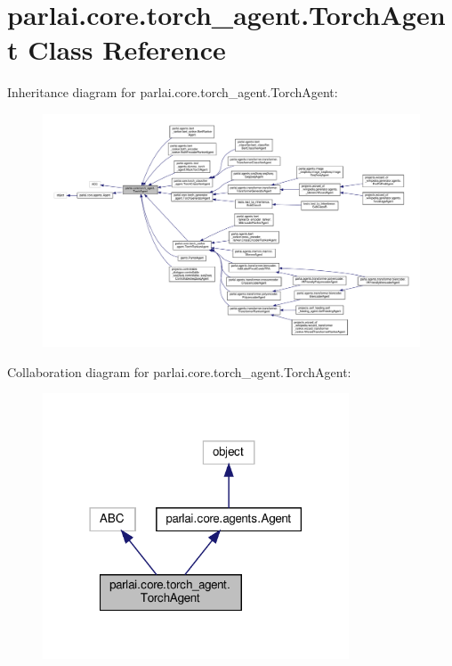\hypertarget{classparlai_1_1core_1_1torch__agent_1_1TorchAgent}{}\section{parlai.\+core.\+torch\+\_\+agent.\+Torch\+Agent Class Reference}
\label{classparlai_1_1core_1_1torch__agent_1_1TorchAgent}


Inheritance diagram for parlai.\+core.\+torch\+\_\+agent.\+Torch\+Agent\+:
\nopagebreak
\begin{figure}[H]
\begin{center}
\leavevmode
\includegraphics[width=350pt]{d0/d92/classparlai_1_1core_1_1torch__agent_1_1TorchAgent__inherit__graph}
\end{center}
\end{figure}


Collaboration diagram for parlai.\+core.\+torch\+\_\+agent.\+Torch\+Agent\+:
\nopagebreak
\begin{figure}[H]
\begin{center}
\leavevmode
\includegraphics[width=258pt]{d2/d85/classparlai_1_1core_1_1torch__agent_1_1TorchAgent__coll__graph}
\end{center}
\end{figure}
